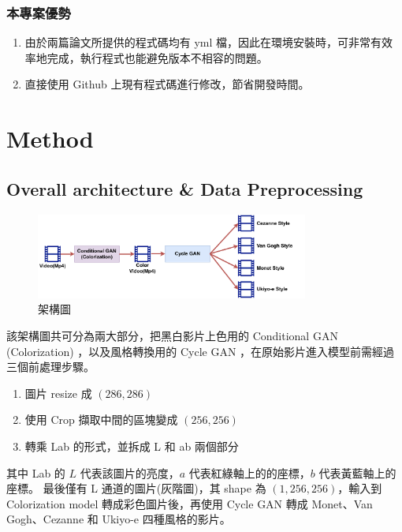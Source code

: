 \documentclass[a4paper, 12pt]{article}
\begin{document}
\begin{CJK}{UTF8}{bkai}
			\subsubsection{本專案優勢}
			\begin{enumerate}
				\item 由於兩篇論文所提供的程式碼均有 yml 檔，因此在環境安裝時，可非常有效率地完成，執行程式也能避免版本不相容的問題。
				\item 直接使用 Github \cite{torch-cyclegan-pix2pix} 上現有程式碼進行修改，節省開發時間。
			\end{enumerate}
    \section{Method}
		\subsection{Overall architecture \& Data Preprocessing}

			\begin{figure}[tbh]
				\centering
				\includegraphics[width=0.8\textwidth]{src/Overall_Architecture.pdf}
				\caption{架構圖}
				\label{fig-Overall_Architecture}
			\end{figure}
			
			該架構圖共可分為兩大部分，把黑白影片上色用的 Conditional GAN (Colorization) \cite{pix2pix}，以及風格轉換用的 Cycle GAN \cite{cyclegan}，在原始影片進入模型前需經過三個前處理步驟。
			\begin{enumerate}
				\item 圖片 resize 成 $(286, 286)$
				\item 使用 Crop 擷取中間的區塊變成 $(256, 256)$
				\item 轉乘 Lab 的形式，並拆成 L 和 ab 兩個部分
			\end{enumerate}
			其中 Lab 的 $L$ 代表該圖片的亮度，$a$ 代表紅綠軸上的的座標，$b$ 代表黃藍軸上的座標。
			最後僅有 L 通道的圖片(灰階圖)，其 shape 為 $(1, 256, 256)$，輸入到 Colorization model 轉成彩色圖片後，再使用 Cycle GAN 轉成 Monet、Van Gogh、Cezanne 和 Ukiyo-e 四種風格的影片。
			

\end{CJK}
\end{document}

